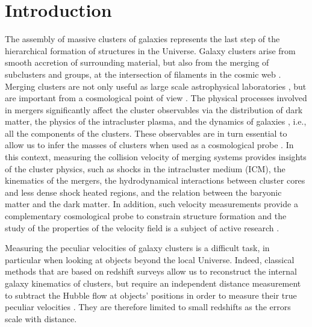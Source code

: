 \documentclass[twocolumn,traditabstract]{aa}
\begin{document}
\section{Introduction}\label{sec:Introduction}
The assembly of massive clusters of galaxies represents the last step of the hierarchical formation of structures in the Universe. Galaxy clusters arise from smooth accretion of surrounding material, but also from the merging of subclusters and groups, at the intersection of filaments in the cosmic web \citep[see][for a review]{Kravtsov2012}. Merging clusters are not only useful as large scale astrophysical laboratories \citep[e.g.,][]{Clowe2006}, but are important from a cosmological point of view \citep[e.g.,][]{Voit2005}. The physical processes involved in mergers significantly affect the cluster observables via the distribution of dark matter, the physics of the intracluster plasma, and the dynamics of galaxies \citep[e.g.,][]{Ferrari2005,Maurogordato2011}, i.e., all the components of the clusters. These observables are in turn essential to allow us to infer the masses of clusters when used as a cosmological probe \citep[see][for a review]{Allen2011}. In this context, measuring the collision velocity of merging systems provides insights of the cluster physics, such as shocks in the intracluster medium (ICM), the kinematics of the mergers, the hydrodynamical interactions between cluster cores and less dense shock heated regions, and the relation between the baryonic matter and the dark matter. In addition, such velocity measurements provide a complementary cosmological probe to constrain structure formation \citep{Bhattacharya2007} and the study of the properties of the velocity field is a subject of active research \citep[e.g.,][using numerical simulations]{Hahn2015}. 

Measuring the peculiar velocities of galaxy clusters is a difficult task, in particular when looking at objects beyond the local Universe. Indeed, classical methods that are based on redshift surveys allow us to reconstruct the internal galaxy kinematics of clusters, but require an independent distance measurement to subtract the Hubble flow at objects' positions in order to measure their true peculiar velocities \citep[e.g.,][]{Tully1977}. They are therefore limited to small redshifts as the errors scale with distance. 
\end{document}

